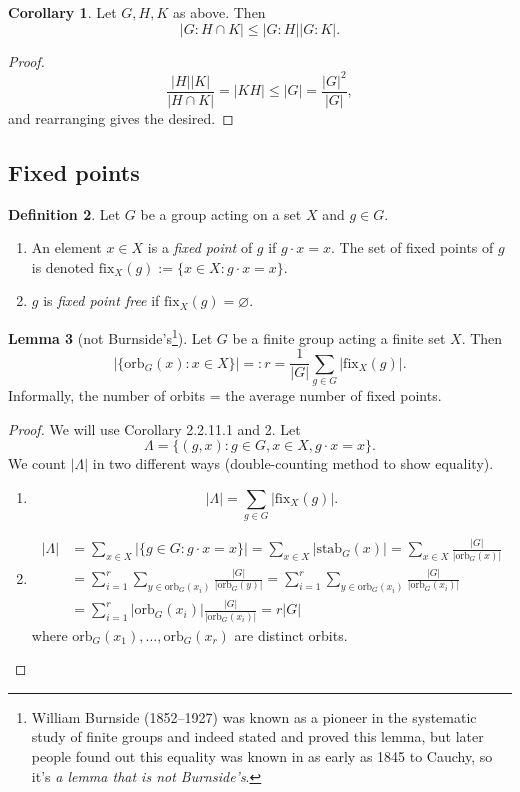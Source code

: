 \documentclass[a4paper]{article}
\newcommand{\orb}{\text{orb}}
\newcommand{\stab}{\text{stab}}
\newcommand{\fix}{\text{fix}}
\theoremstyle{definition}
\newtheorem{defn}{Definition}[subsection]
\newtheorem{lemma}[defn]{Lemma}
\newtheorem{coro}[defn]{Corollary}
\begin{document}
\begin{coro}
Let $G,H,K$ as above. Then
\[
|G:H\cap K|\leq |G:H||G:K|.
\]
\end{coro}
\begin{proof}
\[
\frac{|H||K|}{|H\cap K|}=|KH|\leq |G|=\frac{|G|^2}{|G|},
\]
and rearranging gives the desired.
\end{proof}

\subsection{Fixed points}
\begin{defn}
Let $G$ be a group acting on a set $X$ and $g\in G$.
\begin{enumerate}
\item An element $x\in X$ is a \textit{fixed point} of $g$ if $g\cdot x=x$. The set of fixed points of $g$ is denoted $\fix_X(g):=\{x\in X:g\cdot x=x\}$.
\item $g$ is \textit{fixed point free} if $\fix_X(g)=\varnothing$.
\end{enumerate}
\end{defn}

\begin{lemma}[not Burnside's\footnote{William Burnside (1852–1927) was known as a pioneer in the systematic study of finite groups and indeed stated and proved this lemma, but later people found out this equality was known in as early as 1845 to Cauchy, so it's \textit{a lemma that is not Burnside's}.}]
Let $G$ be a finite group acting a finite set $X$. Then
\[
|\{\orb_G(x):x\in X\}|=:r=\frac{1}{|G|}\sum_{g\in G}|\fix_X(g)|.
\]
Informally, the number of orbits = the average number of fixed points.
\end{lemma}
\begin{proof}
We will use Corollary 2.2.11.1 and 2. Let
\[
\Lambda = \{(g,x):g\in G,x\in X, g\cdot x=x\}.
\]
We count $|\Lambda|$ in two different ways (double-counting method to show equality).
\begin{enumerate}
\item \[
|\Lambda|=\sum_{g\in G} |\fix_X(g)|.
\]
\item \[
\begin{aligned}
|\Lambda|&=\sum_{x\in X} |\{g\in G:g\cdot x=x\}|=\sum_{x\in X} |\stab_G(x)|=\sum_{x\in X} \frac{|G|}{|\orb_G(x)|}\\
&=\sum_{i=1}^r\sum_{y\in\orb_G(x_i)} \frac{|G|}{|\orb_G(y)|}=\sum_{i=1}^r\sum_{y\in\orb_G(x_i)} \frac{|G|}{|\orb_G(x_i)|} \\
&=\sum_{i=1}^r |\orb_G(x_i)| \frac{|G|}{|\orb_G(x_i)|}=r|G|
\end{aligned}
\]
where $\orb_G(x_1),\ldots,\orb_G(x_r)$ are distinct orbits.
\end{enumerate}
\end{proof}
\end{document}
